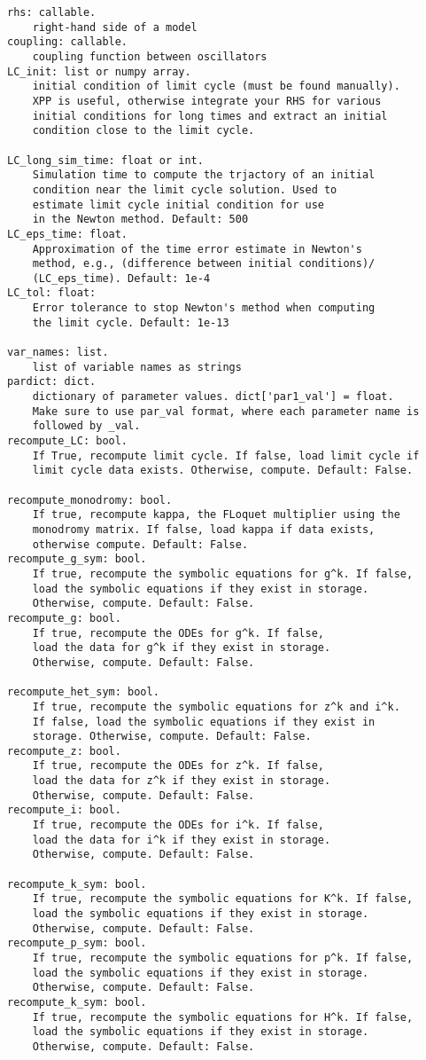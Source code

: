 \documentclass[english,a4paper,oneside]{article}
\begin{document}
\begin{verbatim}
rhs: callable.
    right-hand side of a model
coupling: callable.
    coupling function between oscillators
LC_init: list or numpy array.
    initial condition of limit cycle (must be found manually).
    XPP is useful, otherwise integrate your RHS for various
    initial conditions for long times and extract an initial
    condition close to the limit cycle.

LC_long_sim_time: float or int.
    Simulation time to compute the trjactory of an initial 
    condition near the limit cycle solution. Used to
    estimate limit cycle initial condition for use 
    in the Newton method. Default: 500
LC_eps_time: float.
    Approximation of the time error estimate in Newton's
    method, e.g., (difference between initial conditions)/
    (LC_eps_time). Default: 1e-4
LC_tol: float:
    Error tolerance to stop Newton's method when computing
    the limit cycle. Default: 1e-13

var_names: list.
    list of variable names as strings
pardict: dict.
    dictionary of parameter values. dict['par1_val'] = float.
    Make sure to use par_val format, where each parameter name is
    followed by _val.
recompute_LC: bool.
    If True, recompute limit cycle. If false, load limit cycle if
    limit cycle data exists. Otherwise, compute. Default: False.

recompute_monodromy: bool.
    If true, recompute kappa, the FLoquet multiplier using the
    monodromy matrix. If false, load kappa if data exists,
    otherwise compute. Default: False.
recompute_g_sym: bool.
    If true, recompute the symbolic equations for g^k. If false,
    load the symbolic equations if they exist in storage.
    Otherwise, compute. Default: False.
recompute_g: bool.
    If true, recompute the ODEs for g^k. If false,
    load the data for g^k if they exist in storage.
    Otherwise, compute. Default: False.

recompute_het_sym: bool.
    If true, recompute the symbolic equations for z^k and i^k.
    If false, load the symbolic equations if they exist in
    storage. Otherwise, compute. Default: False.
recompute_z: bool.
    If true, recompute the ODEs for z^k. If false,
    load the data for z^k if they exist in storage.
    Otherwise, compute. Default: False.
recompute_i: bool.
    If true, recompute the ODEs for i^k. If false,
    load the data for i^k if they exist in storage.
    Otherwise, compute. Default: False.

recompute_k_sym: bool.
    If true, recompute the symbolic equations for K^k. If false,
    load the symbolic equations if they exist in storage.
    Otherwise, compute. Default: False.
recompute_p_sym: bool.
    If true, recompute the symbolic equations for p^k. If false,
    load the symbolic equations if they exist in storage.
    Otherwise, compute. Default: False.
recompute_k_sym: bool.
    If true, recompute the symbolic equations for H^k. If false,
    load the symbolic equations if they exist in storage.
    Otherwise, compute. Default: False.


\end{verbatim}
\end{document}
